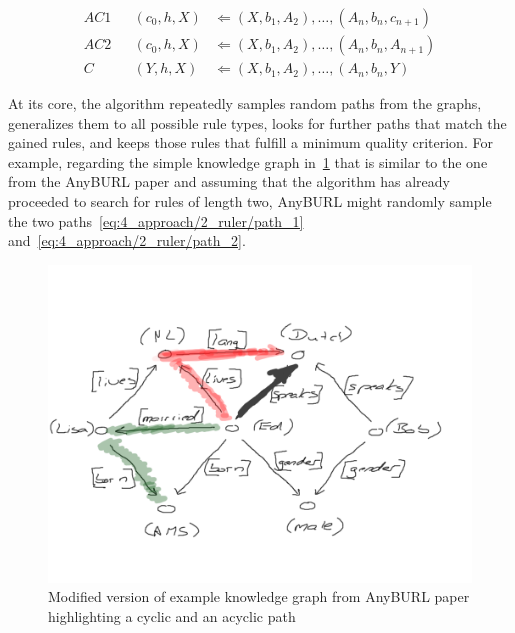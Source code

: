 \begin{align}
    AC1 && (c_0, h, X) &\Leftarrow (X, b_1, A_2), \dots, (A_n, b_n, c_{n+1})
    \label{eq:4_approach/2_ruler/ac1} \\

    AC2 && (c_0, h, X) &\Leftarrow (X, b_1, A_2), \dots, (A_n, b_n, A_{n+1})
    \label{eq:4_approach/2_ruler/ac2} \\

    C   && (Y, h, X)   &\Leftarrow (X, b_1, A_2), \dots, (A_n, b_n, Y)
    \label{eq:4_approach/2_ruler/c}
\end{align}

At its core, the algorithm repeatedly samples random paths from the graphs, generalizes them to all possible rule types, looks for further paths that match the gained rules, and keeps those rules that fulfill a minimum quality criterion. For example, regarding the simple knowledge graph in~\ref{figure:example_knowledge_graph} that is similar to the one from the AnyBURL paper and assuming that the algorithm has already proceeded to search for rules of length two, AnyBURL might randomly sample the two paths~\ref{eq:4_approach/2_ruler/path_1} and~\ref{eq:4_approach/2_ruler/path_2}.

\begin{figure}[t]
    \centering
    \includegraphics[width=\textwidth]{4_approach/2_ruler/example_knowledge_graph}
    \caption{Modified version of example knowledge graph from AnyBURL paper highlighting a cyclic and an acyclic path}
    \label{figure:example_knowledge_graph}
\end{figure}

